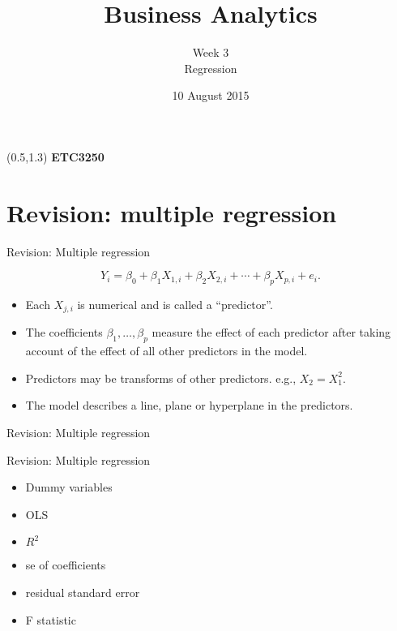 \documentclass[14pt]{beamer}
\title[3. Regression]{Business Analytics}
\author{Week 3\\ Regression}
\date{10 August 2015}
\makeatletter
\def\biz{\begin{itemize}[<+-| alert@+>]}
\def\eiz{\end{itemize}}
\makeatother
\begin{document}
\begin{frame}[plain]{}
\maketitle
\begin{textblock}{11}(0.5,1.3){\color{white}\large
\textbf{ETC3250}}
\end{textblock}
\end{frame}

\section{Revision: multiple regression}


\begin{frame}{Revision: Multiple regression}

\begin{block}{}\vspace*{-0.2cm}
$$Y_i = \beta_0 + \beta_1 X_{1,i} + \beta_2 X_{2,i} + \cdots + \beta_pX_{p,i} + e_i.$$
\end{block}
\biz
\item Each $X_{j,i}$ is numerical and is called a ``predictor''.

\item The coefficients $\beta_1,\dots,\beta_p$ measure the effect of each
predictor after taking account of the effect of all other predictors
in the model.


\item Predictors may be transforms of other predictors. e.g., $X_2=X_1^2$.

\item The model describes a line, plane or hyperplane in the predictors.


\eiz

\end{frame}

\begin{frame}{Revision: Multiple regression}
\end{frame}

\begin{frame}{Revision: Multiple regression}\large
\begin{itemize}[<+-| alert@+>]
\item Dummy variables
\item OLS
\item $R^2$
\item se of coefficients
\item residual standard error
\item F statistic
\end{itemize}
\end{frame}
\end{document}
